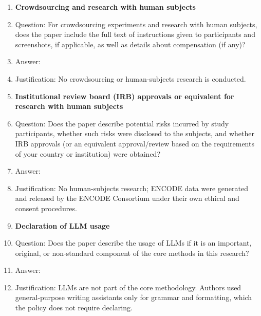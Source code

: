 \begin{enumerate}
\item {\bf Crowdsourcing and research with human subjects}
    \item[] Question: For crowdsourcing experiments and research with human subjects, does the paper include the full text of instructions given to participants and screenshots, if applicable, as well as details about compensation (if any)?
    \item[] Answer: \answerNA{}
    \item[] Justification: No crowdsourcing or human-subjects research is conducted.

\item {\bf Institutional review board (IRB) approvals or equivalent for research with human subjects}
    \item[] Question: Does the paper describe potential risks incurred by study participants, whether such risks were disclosed to the subjects, and whether IRB approvals (or an equivalent approval/review based on the requirements of your country or institution) were obtained?
    \item[] Answer: \answerNA{}
    \item[] Justification: No human-subjects research; ENCODE data were generated and released by the ENCODE Consortium under their own ethical and consent procedures.

\item {\bf Declaration of LLM usage}
    \item[] Question: Does the paper describe the usage of LLMs if it is an important, original, or non-standard component of the core methods in this research?
    \item[] Answer: \answerNA{}
    \item[] Justification: LLMs are not part of the core methodology. Authors used general-purpose writing assistants only for grammar and formatting, which the policy does not require declaring.

\end{enumerate}
